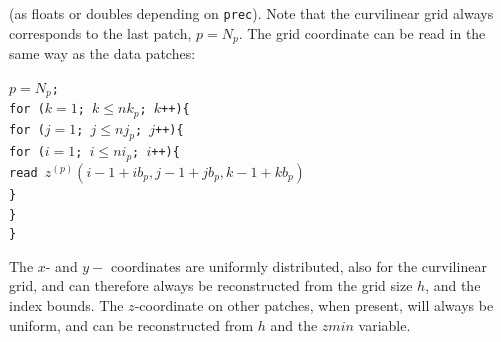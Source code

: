 \documentclass[11pt]{report}
\begin{document}
(as floats or doubles depending on {\tt prec}). Note that the curvilinear grid always
corresponds to the last patch, $p=N_p$. The grid coordinate can be read in the same way as
the data patches:
\begin{flushleft}
{\tt $p=N_p$;\\
for ($k=1$; $k\leq nk_p$; $k$++)\{\\
\hspace{5mm}for ($j=1$; $j\leq nj_p$; $j$++)\{\\
\hspace{10mm}for ($i=1$; $i\leq ni_p$; $i$++)\{\\
\hspace{15mm}read $z^{(p)}(i-1+ib_p, j-1+jb_p,k-1+kb_p)$\\
\hspace{10mm}\}\\
\hspace{5mm}\}\\
\}}
\end{flushleft}
The $x$- and $y-$ coordinates are uniformly distributed, also for the curvilinear grid, and can therefore always be
reconstructed from the grid size $h$, and the index bounds. The $z$-coordinate on other patches, when present, will
always be uniform, and can be reconstructed from $h$ and the $zmin$ variable.




\end{document}
